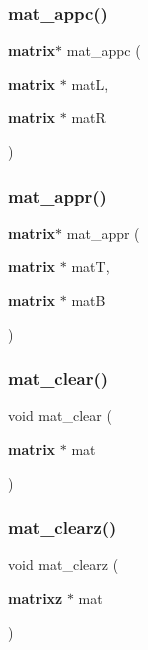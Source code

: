 \mbox{\label{mat_lib_8h_a164005b93ec6c62e90e451c3178b408e}} 
\subsubsection{mat\+\_\+appc()}
{\footnotesize\ttfamily \textbf{ matrix}$\ast$ mat\+\_\+appc (\begin{DoxyParamCaption}\item[{\textbf{ matrix} $\ast$}]{matL,  }\item[{\textbf{ matrix} $\ast$}]{matR }\end{DoxyParamCaption})}

\mbox{\label{mat_lib_8h_a15ca905b96bba841373e7d2a322ebcd6}} 
\subsubsection{mat\+\_\+appr()}
{\footnotesize\ttfamily \textbf{ matrix}$\ast$ mat\+\_\+appr (\begin{DoxyParamCaption}\item[{\textbf{ matrix} $\ast$}]{matT,  }\item[{\textbf{ matrix} $\ast$}]{matB }\end{DoxyParamCaption})}

\mbox{\label{mat_lib_8h_a05c2ec45f20506e940aaa4dad28ce5ec}} 
\subsubsection{mat\+\_\+clear()}
{\footnotesize\ttfamily void mat\+\_\+clear (\begin{DoxyParamCaption}\item[{\textbf{ matrix} $\ast$}]{mat }\end{DoxyParamCaption})}

\mbox{\label{mat_lib_8h_ae6da08d9e7910d24e31f0a0fea0fb2b3}} 
\subsubsection{mat\+\_\+clearz()}
{\footnotesize\ttfamily void mat\+\_\+clearz (\begin{DoxyParamCaption}\item[{\textbf{ matrixz} $\ast$}]{mat }\end{DoxyParamCaption})}

